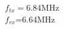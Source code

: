 \documentclass[preview]{standalone}
\begin{document}
\begin{center}
$f_{tx}=$6.84MHz\\$f_{rx}$=6.64MHz
\end{center}
\end{document}
